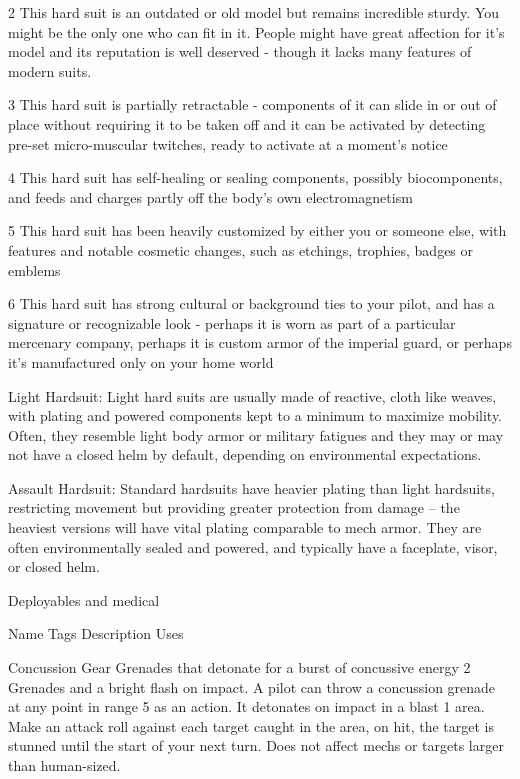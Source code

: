   2      This hard suit is an outdated or old model but remains incredible sturdy. You might be the only one who can
         fit in it. People might have great affection for it's model and its reputation is well deserved - though it lacks
         many features of modern suits.

  3      This hard suit is partially retractable - components of it can slide in or out of place without requiring it to be
         taken off and it can be activated by detecting pre-set micro-muscular twitches, ready to activate at a
         moment's notice

  4      This hard suit has self-healing or sealing components, possibly biocomponents, and feeds and charges
         partly off the body's own electromagnetism

  5      This hard suit has been heavily customized by either you or someone else, with features and notable
         cosmetic changes, such as etchings, trophies, badges or emblems

  6      This hard suit has strong cultural or background ties to your pilot, and has a signature or recognizable look -
         perhaps it is worn as part of a particular mercenary company, perhaps it is custom armor of the imperial
         guard, or perhaps it's manufactured only on your home world

Light Hardsuit: Light hard suits are usually made of reactive, cloth like weaves, with plating and
powered components kept to a minimum to maximize mobility. Often, they resemble light body
armor or military fatigues and they may or may not have a closed helm by default, depending on
environmental expectations.





Assault Hardsuit: Standard hardsuits have heavier plating than light hardsuits, restricting
movement but providing greater protection from damage -- the heaviest versions will have vital
plating comparable to mech armor. They are often environmentally sealed and powered, and
typically have a faceplate, visor, or closed helm.


                                              Deployables and medical

    Name                   Tags        Description                                                            Uses

    Concussion             Gear        Grenades that detonate for a burst of concussive energy               2
    Grenades                           and a bright flash on impact. A pilot can throw a
                                       concussion grenade at any point in range 5 as an action.
                                       It detonates on impact in a blast 1 area. Make an attack
                                       roll against each target caught in the area, on hit, the
                                       target is stunned until the start of your next turn. Does not
                                       affect mechs or targets larger than human-sized.


